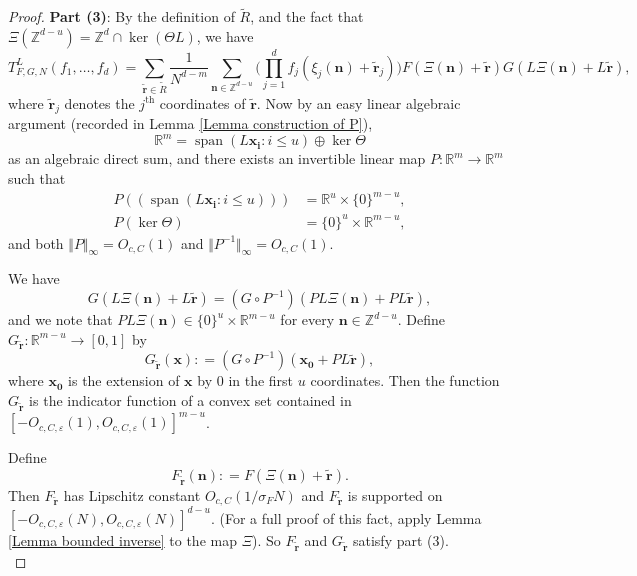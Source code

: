 \documentclass[12pt,a4paper,twoside,reqno]{amsart}
\newcommand{\spn}{\operatorname{span}}
\numberwithin{equation}{section}
\begin{document}
\begin{proof}
\textbf{Part (3)}: By the definition of $\widetilde{R}$, and the fact that $\Xi(\mathbb{Z}^{d-u}) = \mathbb{Z}^d \cap \ker (\Theta L)$, we have  
\begin{equation}
\label{equation getting integer rows}
T_{F,G,N}^L(f_1,\dots,f_d) = \sum\limits_{\widetilde{\mathbf{r}} \in \widetilde{R}}\frac{1}{N^{d-m}} \sum\limits_{\mathbf{n} \in \mathbb{Z}^{d-u}} \Big(\prod\limits_{j=1}^d f_j(\xi_j(\mathbf{n}) + \widetilde{\mathbf{r}}_j) \Big)F(\Xi(\mathbf{n}) + \widetilde{\mathbf{r}}) G(L\Xi(\mathbf{n}) + L\widetilde{\mathbf{r}}),
\end{equation}
\noindent where $\widetilde{\mathbf{r}}_j$ denotes the $j^{\text{th}}$ coordinates of $\widetilde{\mathbf{r}}$. Now by an easy linear algebraic argument (recorded in Lemma \ref{Lemma construction of P}), 
\begin{equation}
\label{direct sum}
\mathbb{R}^m = \spn(L\mathbf{x_i}:i\leqslant u) \oplus \ker \Theta
\end{equation} as an algebraic direct sum, and there exists an invertible linear map $P:\mathbb{R}^m \longrightarrow \mathbb{R}^m$ such that \begin{align}
\label{equation properties of P}
P((\spn(L\mathbf{x_i}:i\leqslant u))) &= \mathbb{R}^u \times \{0\}^{m-u}, \\
\label{equation properties of P 2}
P(\ker \Theta) &= \{0\}^{u} \times \mathbb{R}^{m-u}, 
\end{align}
\noindent and both $\Vert P\Vert_\infty = O_{c,C}(1)$ and $\Vert P^{-1} \Vert_\infty = O_{c,C}(1)$. 

We have \[ G(L\Xi(\mathbf{n}) + L\widetilde{\mathbf{r}}) = (G \circ P^{-1})(PL\Xi(\mathbf{n}) + PL\widetilde{\mathbf{r}}),\] and we note that $PL\Xi(\mathbf{n}) \in \{0\}^u \times \mathbb{R}^{m-u}$ for every $\mathbf{n} \in \mathbb{Z}^{d-u}$. Define $G_{\widetilde{\mathbf{r}}}:\mathbb{R}^{m-u} \longrightarrow [0,1]$ by \[G_{\widetilde{\mathbf{r}}}(\mathbf{x}) : = (G\circ P^{-1})(\mathbf{x_0} + PL\widetilde{\mathbf{r}}),\] where $\mathbf{x_0}$ is the extension of $\mathbf{x}$ by $0$ in the first $u$ coordinates. Then the function $G_{\widetilde{\mathbf{r}}}$ is the indicator function of a convex set contained in $[-O_{c,C,\varepsilon}(1),O_{c,C,\varepsilon}(1)]^{m-u}$. 

Define \[F_{\widetilde{\mathbf{r}}}(\mathbf{n}) : =  F(\Xi(\mathbf{n}) + \widetilde{\mathbf{r}}).\] Then $F_{\widetilde{\mathbf{r}}}$ has Lipschitz constant $O_{c,C}(1/\sigma_F N)$ and $F_{\widetilde{\mathbf{r}}}$ is supported on \\$[-O_{c,C,\varepsilon}(N),O_{c,C,\varepsilon}(N)]^{d-u}$. (For a full proof of this fact, apply Lemma \ref{Lemma bounded inverse} to the map $\Xi$). So $F_{\widetilde{\mathbf{r}}}$  and $G_{\widetilde{\mathbf{r}}}$ satisfy part (3).\\


\end{proof}
\end{document}
